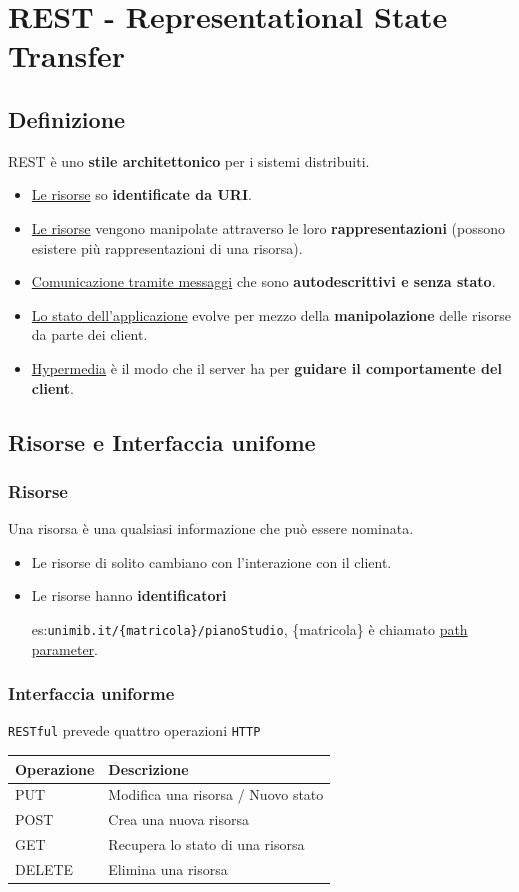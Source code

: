 \chapter{REST - Representational State Transfer}
\section{Definizione}
REST è uno \textbf{stile architettonico} per i sistemi distribuiti.

\begin{itemize}
    \item \uline{Le risorse} so \textbf{identificate da URI}.
    \item \uline{Le risorse} vengono manipolate attraverso le loro \textbf{rappresentazioni} (possono esistere più rappresentazioni di una risorsa).
    \item \uline{Comunicazione tramite messaggi} che sono \textbf{autodescrittivi e senza stato}.
    \item \uline{Lo stato dell'applicazione} evolve per mezzo della \textbf{manipolazione} delle risorse da parte dei client.
    \item \uline{Hypermedia} è il modo che il server ha per \textbf{guidare il comportamente del client}.
\end{itemize}

\section{Risorse e Interfaccia unifome}
\subsection{Risorse}
Una risorsa è una qualsiasi informazione che può essere nominata.
\begin{itemize}
    \item Le risorse di solito cambiano con l'interazione con il client.
    \item Le risorse hanno \textbf{identificatori}
    
    es:\texttt{unimib.it/\{matricola\}/pianoStudio}, \{matricola\} è chiamato \uline{path parameter}.
\end{itemize}

\subsection{Interfaccia uniforme}
\texttt{RESTful} prevede quattro operazioni \texttt{HTTP}
\begin{table}[h]
    \centering
    \begin{tabularx}{\textwidth}{|l|X|}
    \hline
    \textbf{Operazione} & \textbf{Descrizione} \\ \hline
    PUT & Modifica una risorsa / Nuovo stato \\ \hline
    POST & Crea una nuova risorsa \\ \hline
    GET & Recupera lo stato di una risorsa \\ \hline
    DELETE & Elimina una risorsa \\ \hline
    \end{tabularx}
\end{table}

